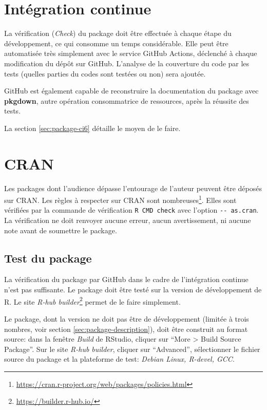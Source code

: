 \documentclass[
  12pt,
  french,
  a4paper,
  extrafontsizes,onecolumn,openright
  ]{memoir}
\begin{document}
\hypertarget{sec:package-ci5}{%
\section{Intégration continue}\label{sec:package-ci5}}

La vérification (\emph{Check}) du package doit être effectuée à chaque étape du développement, ce qui consomme un temps considérable.
Elle peut être automatisée très simplement avec le service GitHub Actions, déclenché à chaque modification du dépôt sur GitHub.
L'analyse de la couverture du code par les tests (quelles parties du codes sont testées ou non) sera ajoutée.

GitHub est également capable de reconstruire la documentation du package avec \textbf{pkgdown}, autre opération consommatrice de ressources, après la réussite des tests.

La section \ref{sec:package-ci6} détaille le moyen de le faire.

\hypertarget{sec:package-cran}{%
\section{CRAN}\label{sec:package-cran}}

Les packages dont l'audience dépasse l'entourage de l'auteur peuvent être déposés sur CRAN.
Les règles à respecter sur CRAN sont nombreuses\footnote{\url{https://cran.r-project.org/web/packages/policies.html}}. Elles sont vérifiées par la commande de vérification \texttt{R\ CMD\ check} avec l'option \texttt{-\/-\ as.cran}.
La vérification ne doit renvoyer aucune erreur, aucun avertissement, ni aucune note avant de soumettre le package.

\hypertarget{test-du-package}{%
\subsection{Test du package}\label{test-du-package}}

La vérification du package par GitHub dans le cadre de l'intégration continue n'est pas suffisante.
Le package doit être testé sur la version de développement de R.
Le site \emph{R-hub builder}\footnote{\url{https://builder.r-hub.io/}} permet de le faire simplement.

Le package, dont la version ne doit pas être de développement (limitée à trois nombres, voir section \ref{sec:package-description}), doit être construit au format source: dans la fenêtre \emph{Build} de RStudio, cliquer sur \enquote{More \textgreater{} Build Source Package}.
Sur le site \emph{R-hub builder}, cliquer sur \enquote{Advanced}, sélectionner le fichier source du package et la plateforme de test: \emph{Debian Linux, R-devel, GCC}.
\end{document}
